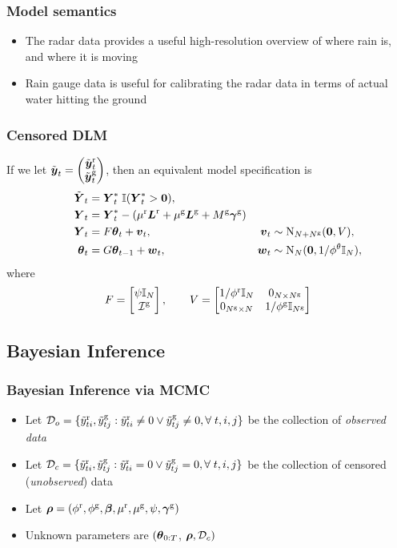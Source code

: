 \begin{frame}
  \frametitle{Model semantics}
  \begin{itemize}
\item  The radar data provides a useful high-resolution overview of where rain is, and where it is moving
\item Rain gauge data is useful for calibrating the radar data in terms of actual water hitting the ground
  \end{itemize}
\end{frame}




\begin{frame}
\frametitle{Censored DLM}
If we let $\tilde{\boldsymbol{y}}_t=
\left(\begin{matrix}
\tilde{\boldsymbol{y}}_t^{\text{r}} \\
\tilde{\boldsymbol{y}}_t^{\text{g}}
\end{matrix}\right)$, then an equivalent model specification is
\begin{align*}
\hspace{1cm} \tilde{\boldsymbol{Y}}_{t} &= \boldsymbol{Y}_{t}^*  \; \mathbb{I}(\boldsymbol{Y}_{t}^* > \boldsymbol{0}), \\
{\boldsymbol{Y}_t}  &= \boldsymbol{Y}_{t}^* - (\mu^{\text{r}} {\boldsymbol{L}^\text{r}} + \mu^{\text{g}} {\boldsymbol{L}^\text{g}} + M^{\text{g}}\boldsymbol{\gamma}^{\text{g}}) \\
{\boldsymbol{Y}_t}  &= F \boldsymbol{\theta}_t  + \boldsymbol{v}_t, & \boldsymbol{v}_t &\sim \text{N}_{N+{N^\text{g}}}(\boldsymbol{0},V ),\\
\boldsymbol{\theta}_t &= G\boldsymbol{\theta}_{t-1} + \boldsymbol{w}_t, & \boldsymbol{w}_t &\sim \text{N}_{N}(\boldsymbol{0},1/\phi^\theta {\mathbb{I}_{N}}),
\end{align*}
\bigskip
where
\[
F = 
\begin{bmatrix}
\psi {\mathbb{I}_{N}} \\
\mathcal{I}^{\text{g}}
\end{bmatrix},
\qquad
V = 
\begin{bmatrix}
1/{\phi^\text{r}} {\mathbb{I}_{N}} & 0_{N\times{N^\text{g}}}\\
0_{{N^\text{g}}\times N} & 1/{\phi^\text{g}} {\mathbb{I}_{N^\text{g}}}
\end{bmatrix}
\]
\end{frame}




\subsection{Bayesian Inference}
\begin{frame}
\frametitle{Bayesian Inference via MCMC}
\bigskip
\begin{itemize}
\item Let $\mathcal{D}_o=\{\tilde{y}^{\text{r}}_{ti},\tilde{y}^{\text{g}}_{tj} : \tilde{y}_{ti}^{\text{r}} \neq 0 \lor \tilde{y}_{tj}^{\text{g}} \neq 0, \forall \; t,i,j \}$ be the collection of \textit{observed data}
\bigskip
\item Let $\mathcal{D}_c=\{\tilde{y}^{\text{r}}_{ti},\tilde{y}^{\text{g}}_{tj} : \tilde{y}_{ti}^{\text{r}} = 0 \lor \tilde{y}_{tj}^{\text{g}}=0, \forall \; t,i,j \}$ be the collection of censored (\textit{unobserved}) data
\bigskip
\item Let $\boldsymbol{\rho}= ( {\phi^\text{r}},{\phi^\text{g}},\boldsymbol{\beta},\mu^{\text{r}},\mu^{\text{g}},\psi,\boldsymbol{\gamma}^{\text{g}})$
\bigskip
\item Unknown parameters are $(\boldsymbol{\theta}_{0:T}$, $\boldsymbol{\rho}, \mathcal{D}_c)$

\end{itemize}
\end{frame}


